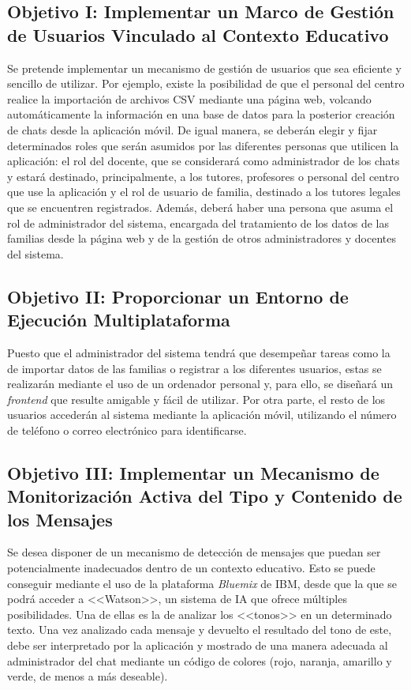 \subsection{Objetivo I: Implementar un Marco de Gestión de Usuarios Vinculado al Contexto Educativo}
Se pretende implementar un mecanismo de gestión de usuarios que sea eficiente y sencillo de utilizar. Por ejemplo, existe la posibilidad de que el personal del centro realice la importación de archivos \acs{CSV} mediante una página web, volcando automáticamente la información en una base de datos para la posterior creación de chats desde la aplicación móvil. De igual manera, se deberán elegir y fijar determinados roles que serán asumidos por las diferentes personas que utilicen la aplicación: el rol del docente, que se considerará como administrador de los chats y estará destinado, principalmente, a los tutores, profesores o personal del centro que use la aplicación y el rol de usuario de familia, destinado a los tutores legales que se encuentren registrados. Además, deberá haber una persona que asuma el rol de administrador del sistema, encargada del tratamiento de los datos de las familias desde la página web y de la gestión de otros administradores y docentes del sistema.

\subsection{Objetivo II: Proporcionar un Entorno de Ejecución Multiplataforma}
Puesto que el administrador del sistema tendrá que desempeñar tareas como la de importar datos de las familias o registrar a los diferentes usuarios, estas se realizarán mediante el uso de un ordenador personal y, para ello, se diseñará un \textit{frontend} que resulte amigable y fácil de utilizar. Por otra parte, el resto de los usuarios accederán al sistema mediante la aplicación móvil, utilizando el número de teléfono o correo electrónico para identificarse.

\subsection{Objetivo III: Implementar un Mecanismo de Monitorización Activa del Tipo y Contenido de los Mensajes}
Se desea disponer de un mecanismo de detección de mensajes que puedan ser potencialmente inadecuados dentro de un contexto educativo. Esto se puede conseguir mediante el uso de la plataforma \textit{Bluemix} de IBM, desde que la que se podrá acceder a <<Watson>>, un sistema de \acs{IA} que ofrece múltiples posibilidades. Una de ellas es la de analizar los <<tonos>> en un determinado texto. Una vez analizado cada mensaje y devuelto el resultado del tono de este, debe ser interpretado por la aplicación y mostrado de una manera adecuada al administrador del chat mediante un código de colores (rojo, naranja, amarillo y verde, de menos a más deseable).

